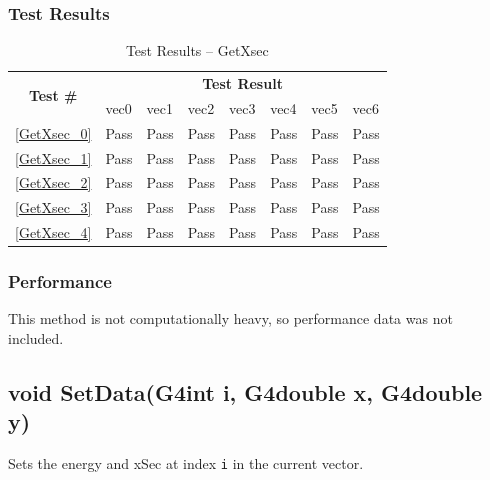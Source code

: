 \documentclass[12pt]{article}
\begin{document}
	\subsubsection{Test Results}
		\begin{table}[H]
		\centering
		\caption{Test Results -- GetXsec}\label{GetXsec_acc}
		\begin{tabular}{clllllll}
		\toprule
		\multirow{2}{*}{\bf Test \#} & \multicolumn{7}{c}{\bf Test Result}\\
		& vec0 & vec1 & vec2 & vec3 & vec4 & vec5 & vec6\\\midrule
		\ref{GetXsec_0} & Pass & Pass & Pass & Pass & Pass & Pass & Pass\\
		\ref{GetXsec_1} & Pass & Pass & Pass & Pass & Pass & Pass & Pass\\
		\ref{GetXsec_2} & Pass & Pass & Pass & Pass & Pass & Pass & Pass\\
		\ref{GetXsec_3} & Pass & Pass & Pass & Pass & Pass & Pass & Pass\\
		\ref{GetXsec_4} & Pass & Pass & Pass & Pass & Pass & Pass & Pass\\
		\bottomrule
		\end{tabular}
		\end{table}

	\subsubsection{Performance}
		This method is not computationally heavy, so performance data was not included.
		
\subsection{void SetData(G4int i, G4double x, G4double y)}
	
	Sets the energy and xSec at index \texttt{i} in the current vector. 
	
\end{document}
